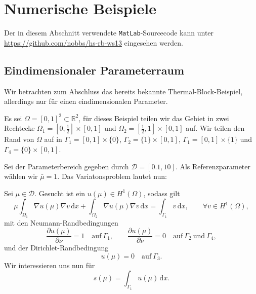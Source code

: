 
\section{Numerische Beispiele} %
\label{sec:beispiel}

Der in diesem Abschnitt verwendete \texttt{MatLab}-Sourcecode kann unter \url{https://github.com/nobbs/hs-rb-ws13} eingesehen werden.

\subsection{Eindimensionaler Parameterraum} %
\label{sub:eindimensionaler_parameterraum}


Wir betrachten zum Abschluss das bereits bekannte Thermal-Block-Beispiel, allerdings nur für einen eindimensionalen Parameter.

Es sei $\Omega = [ 0, 1 ]^2 \subset \mathbb{R}^2$, für dieses Beispiel teilen wir das Gebiet in zwei Rechtecke $\Omega_1 = [0, \frac{1}{2}] \times [ 0, 1 ] $ und $\Omega_2 = [ \frac{1}{2}, 1 ] \times [ 0, 1 ]$ auf. Wir teilen den Rand von $\Omega$ auf in $\Gamma_1 = [0, 1] \times \{ 0 \}$, $\Gamma_2 = \{ 1 \} \times [0, 1]$, $\Gamma_1 = [0, 1] \times \{ 1 \}$ und $\Gamma_4 = \{ 0 \} \times [0, 1]$.

Sei der Parameterbereich gegeben durch $\mathcal D = [0.1, 10]$. Als Referenzparameter wählen wir $\bar \mu = 1$.
Das Variatonsproblem lautet nun:
\begin{addmargin}[2em]{2em}
Sei $\mu \in \mathcal D$. Gesucht ist ein $u(\mu) \in H^1(\Omega)$, sodass gilt
\begin{equation}
    \mu \int_{\Omega_1} \nabla u(\mu) \nabla v \, \mathrm d x + \int_{\Omega_2} \nabla u(\mu) \nabla v \, \mathrm d x = \int_{\Gamma_1} v \, \mathrm{d} x, \qquad \forall v \in H^1(\Omega),
\end{equation}
mit den Neumann-Randbedingungen
\begin{equation}
    \frac{\partial u(\mu)}{\partial \nu} = 1
    \quad \text{auf}~ \Gamma_1,
    \qquad
    \frac{\partial u(\mu)}{\partial \nu} = 0
    \quad \text{auf} ~ \Gamma_2 ~\text{und}~ \Gamma_4,
\end{equation}
und der Dirichlet-Randbedingung
\begin{equation}
    u(\mu) = 0 \quad \text{auf} ~\Gamma_3.
\end{equation}
Wir interessieren uns nun für
\begin{equation}
    s(\mu) = \int_{\Gamma_1} u(\mu) \, \mathrm{d}x.
\end{equation}
\end{addmargin}

